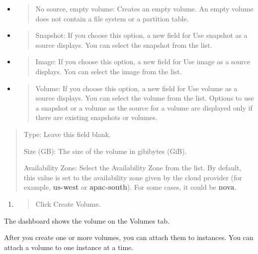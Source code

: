 \begin{itemize}
\item
  \begin{quote}
  No source, empty volume: Creates an empty volume. An empty volume does
  not contain a file system or a partition table.
  \end{quote}
\item
  \begin{quote}
  Snapshot: If you choose this option, a new field for Use snapshot as a
  source displays. You can select the snapshot from the list.
  \end{quote}
\item
  \begin{quote}
  Image: If you choose this option, a new field for Use image as a
  source displays. You can select the image from the list.
  \end{quote}
\item
  \begin{quote}
  Volume: If you choose this option, a new field for Use volume as a
  source displays. You can select the volume from the list. Options to
  use a snapshot or a volume as the source for a volume are displayed
  only if there are existing snapshots or volumes.
  \end{quote}
\end{itemize}

\begin{quote}
Type: Leave this field blank.

Size (GB): The size of the volume in gibibytes (GiB).

Availability Zone: Select the Availability Zone from the list. By
default, this value is set to the availability zone given by the cloud
provider (for example, \textbf{us-west} or \textbf{apac-south}). For
some cases, it could be \textbf{nova}.
\end{quote}

\begin{enumerate}
\def\labelenumi{\arabic{enumi}.}
\item
  \begin{quote}
  Click Create Volume.
  \end{quote}
\end{enumerate}

The dashboard shows the volume on the Volumes tab.

\label{attach-a-volume-to-an-instance}

After you create one or more volumes, you can attach them to instances.
You can attach a volume to one instance at a time.


